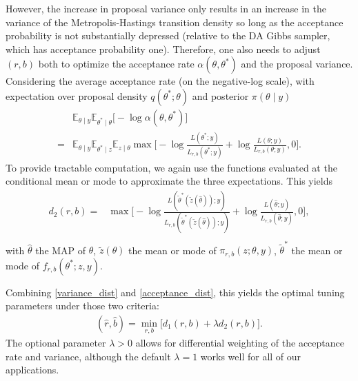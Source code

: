 \documentclass[twoside,11pt]{article}
\newcommand{\1}{\mathbf 1}
\begin{document}
{However, the increase in proposal variance only results in an increase in the variance of the Metropolis-Hastings transition density so long as the acceptance probability is not substantially depressed (relative to the DA Gibbs sampler, which has acceptance probability one). Therefore, one also needs to adjust $(r,b)$ both to optimize the acceptance rate $\alpha(\theta,\theta^*)$ and the proposal variance. Considering the average acceptance rate (on the negative-log scale), with expectation over proposal density $q(\theta^* ; \theta)$ and posterior  $\pi(\theta\mid y)$
\begin{equation*}
	\begin{aligned}
  & \mathbb{E}_{\theta\mid y}\mathbb{E}_{\theta^*\mid\theta} \big[-\log\alpha(\theta,\theta^*) \big]    \\=&
   \mathbb{E}_{\theta\mid y}\mathbb{E}_{\theta^*\mid z} \mathbb{E}_{z\mid \theta}    \max \bigg[ -\log\frac{L(\theta^*;y)}{L_{r,b}(\theta^*;y)} +
  \log\frac{L(\theta;y)}{L_{r,b}(\theta;y)},0\bigg].
  \end{aligned}
\end{equation*}
To provide tractable computation, we again use the functions evaluated at the conditional mean or mode to approximate the three expectations. This yields
\begin{equation}
\label{acceptance_dist}
	\begin{aligned}
d_2(r,b)  =&  \max \bigg[ -\log\frac{L(\tilde \theta^*(\tilde z(\hat\theta));y)}{L_{r,b}(\tilde \theta^*(\tilde z(\hat\theta));y)} +
  \log\frac{L(\hat\theta;y)}{L_{r,b}(\hat\theta;y)},0\bigg],\\
	\end{aligned}
\end{equation}
with $\hat\theta$ the MAP of $\theta$,  $\tilde z(\theta)$ the mean or mode of $\pi_{r,b}(z;\theta,y)$,  $\tilde \theta^*$ the mean or mode of $f_{r,b}(\theta^*;z,y)$.

Combining  \eqref{variance_dist} and \eqref{acceptance_dist}, this yields the optimal tuning parameters under those two criteria:
\begin{equation}
\label{tuning_objective_function}
	\begin{aligned}
(\hat r,\hat b) =  \min_{r,b}  \big[d_1(r,b) + \lambda d_2(r,b)\big].
	\end{aligned}
\end{equation}
The optional parameter $\lambda>0$ allows for differential weighting of the acceptance rate and variance, although the default $\lambda=1$ works well for all of our applications.

}
\end{document}
